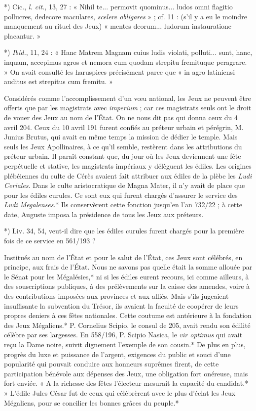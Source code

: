 \documentclass[a4paper, 11pt, oneside, polutonikogreek, french]{article}
\begin{document}
*) Cic., \emph{l. cit.}, 13, 27 : « Nihil te... permovit quominus... ludos omni flagitio pollucres, dedecore maculares, \emph{scelere obligares} » ; cf. 11 : (s'il y a eu le moindre manquement au rituel des Jeux) « mentes deorum... ludorum instauratione placantur. »

*) \emph{Ibid.}, 11, 24 : « Hanc Matrem Magnam cuius ludis violati, polluti... sunt, hanc, inquam, accepimus agros et nemora cum quodam strepitu fremituque peragrare. » On avait consulté les haruspices précisément parce que « in agro latiniensi auditus est strepitus cum fremitu. »

Considérés comme l'accomplissement d'un vœu national, les Jeux ne peuvent être offerts que par les magistrats avec \emph{imperium} ; car ces magistrats seuls ont le droit de vouer des Jeux au nom de l'État. On ne nous dit pas qui donna ceux du 4 avril 204. Ceux du 10 avril 191 furent confiés au préteur urbain et pérégrin, M. Junius Brutus, qui avait en même temps la mission de dédier le temple. Mais seuls les Jeux Apollinaires, à ce qu'il semble, restèrent dans les attributions du préteur urbain. Il paraît constant que, du jour où les Jeux deviennent une fête perpétuelle et stative, les magistrats impériaux y délèguent les édiles. Les origines plébéiennes du culte de Cérès avaient fait attribuer aux édiles de la plèbe les \emph{Ludi Ceriales}. Dans le culte aristocratique de Magna Mater, il n'y avait de place que pour les édiles curules. Ce sont eux qui furent chargés d'assurer le service des \emph{Ludi Megalenses}.* Ils conservèrent cette fonction jusqu'en l'an 732/22 ; à cette date, Auguste imposa la présidence de tous les Jeux aux préteurs.

*) Liv. 34, 54, veut-il dire que les édiles curules furent chargés pour la première fois de ce service en 561/193 ?

Institués au nom de l'État et pour le salut de l'État, ces Jeux sont célébrés, en principe, aux frais de l'État. Nous ne savons pas quelle était la somme allouée par le Sénat pour les Mégalésies,* ni si les édiles eurent recours, ici comme ailleurs, à des souscriptions publiques, à des prélèvements sur la caisse des amendes, voire à des contributions imposées aux provinces et aux alliés. Mais s'ils jugeaient insuffisante la subvention du Trésor, ils avaient la faculté de coopérer de leurs propres deniers à ces fêtes nationales. Cette coutume est antérieure à la fondation des Jeux Mégaliens.* P. Cornelius Scipio, le consul de 205, avait rendu son édilité célèbre par ses largesses. En 558/196, P. Scipio Nasica, le \emph{vir optimus} qui avait reçu la Dame noire, suivit dignement l'exemple de son cousin.* De plus en plus, progrès du luxe et puissance de l'argent, exigences du public et souci d'une popularité qui pouvait conduire aux honneurs suprêmes firent, de cette participation bénévole aux dépenses des Jeux, une obligation fort onéreuse, mais fort enviée. « A la richesse des fêtes l'électeur mesurait la capacité du candidat.* » L'édile Jules César fut de ceux qui célébrèrent avec le plus d'éclat les Jeux Mégaliens, pour se concilier les bonnes grâces du peuple.*
\end{document}
